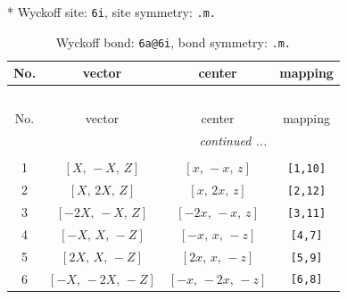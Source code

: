 \documentclass[fleqn,8pt]{jsarticle}
\begin{document}
* Wyckoff site: {\tt 6i}, site symmetry: {\tt .m.}
\renewcommand{\arraystretch}{1.2}
\begin{longtable}{cccc}
\caption{Wyckoff bond: {\tt 6a@6i}, bond symmetry: {\tt .m.}}
 \\
 \hline \hline
No. & vector & center & mapping \\ \hline \endfirsthead

\multicolumn{3}{l}{\tablename\ \thetable{}} \\
 \hline \hline
No. & vector & center & mapping \\ \hline \endhead

 \hline \hline
\multicolumn{3}{r}{\footnotesize\it continued ...} \\ \endfoot

 \hline \hline
\multicolumn{3}{r}{} \\ \endlastfoot

1 & $\left[ X,\, - X,\, Z \right]$ & $\left[ x,\, - x,\, z \right]$ & {\tt [1,10]} \\ \hline
2 & $\left[ X,\, 2 X,\, Z \right]$ & $\left[ x,\, 2 x,\, z \right]$ & {\tt [2,12]} \\ \hline
3 & $\left[ - 2 X,\, - X,\, Z \right]$ & $\left[ - 2 x,\, - x,\, z \right]$ & {\tt [3,11]} \\ \hline
4 & $\left[ - X,\, X,\, - Z \right]$ & $\left[ - x,\, x,\, - z \right]$ & {\tt [4,7]} \\ \hline
5 & $\left[ 2 X,\, X,\, - Z \right]$ & $\left[ 2 x,\, x,\, - z \right]$ & {\tt [5,9]} \\ \hline
6 & $\left[ - X,\, - 2 X,\, - Z \right]$ & $\left[ - x,\, - 2 x,\, - z \right]$ & {\tt [6,8]} \\
\end{longtable}
\renewcommand{\arraystretch}{1.2}
\end{document}
